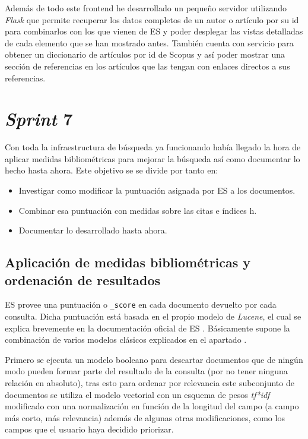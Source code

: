 Además de todo este \gls{frontend} he desarrollado un pequeño servidor utilizando \textit{Flask} que permite recuperar los datos completos de un autor o artículo por su id para combinarlos con los que vienen de \acrshort{ES} y poder desplegar las vistas detalladas de cada elemento que se han mostrado antes. También cuenta con servicio para obtener un diccionario de artículos por id de Scopus y así poder mostrar una sección de referencias en los artículos que las tengan con enlaces directos a sus referencias.

\section{\textit{Sprint} 7}
Con toda la infraestructura de búsqueda ya funcionando había llegado la hora de aplicar medidas bibliométricas para mejorar la búsqueda así como documentar lo hecho hasta ahora. Este objetivo se se divide por tanto en:
\begin{itemize}
	\item Investigar como modificar la puntuación asignada por \acrshort{ES} a los documentos.
	\item Combinar esa puntuación con medidas sobre las citas e índices h.
	\item Documentar lo desarrollado hasta ahora.
\end{itemize}

\subsection{Aplicación de medidas bibliométricas y ordenación de resultados}
\acrlong{ES} provee una puntuación o \texttt{\_score} en cada documento devuelto por cada consulta. Dicha puntuación está basada en el propio modelo de \textit{Lucene}, el cual se explica brevemente en la documentación oficial de \acrshort{ES} \cite{ES_scoring}. Básicamente supone la combinación de varios modelos clásicos explicados en el apartado . 

Primero se ejecuta un modelo booleano para descartar documentos que de ningún modo pueden formar parte del resultado de la consulta (por no tener ninguna relación en absoluto), tras esto para ordenar por relevancia este subconjunto de documentos se utiliza el modelo vectorial con un esquema de pesos \textit{tf*idf} modificado con una normalización en función de la longitud del campo (a campo más corto, más relevancia) además de algunas otras modificaciones, como los campos que el usuario haya decidido priorizar.

